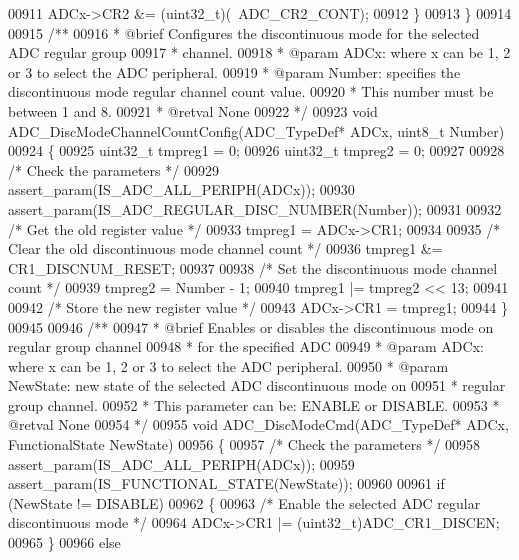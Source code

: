 \begin{DoxyCode}
00911     ADCx->CR2 &= (uint32\_t)(~ADC_CR2_CONT);
00912   \}
00913 \}
00914 
00915 \textcolor{comment}{/**}
00916 \textcolor{comment}{  * @brief  Configures the discontinuous mode for the selected ADC regular group }
00917 \textcolor{comment}{  *         channel.}
00918 \textcolor{comment}{  * @param  ADCx: where x can be 1, 2 or 3 to select the ADC peripheral.}
00919 \textcolor{comment}{  * @param  Number: specifies the discontinuous mode regular channel count value.}
00920 \textcolor{comment}{  *          This number must be between 1 and 8.}
00921 \textcolor{comment}{  * @retval None}
00922 \textcolor{comment}{  */}
00923 \textcolor{keywordtype}{void} ADC_DiscModeChannelCountConfig(ADC\_TypeDef* ADCx, uint8\_t Number)
00924 \{
00925   uint32\_t tmpreg1 = 0;
00926   uint32\_t tmpreg2 = 0;
00927 
00928   \textcolor{comment}{/* Check the parameters */}
00929   assert_param(IS\_ADC\_ALL\_PERIPH(ADCx));
00930   assert_param(IS\_ADC\_REGULAR\_DISC\_NUMBER(Number));
00931 
00932   \textcolor{comment}{/* Get the old register value */}
00933   tmpreg1 = ADCx->CR1;
00934 
00935   \textcolor{comment}{/* Clear the old discontinuous mode channel count */}
00936   tmpreg1 &= CR1_DISCNUM_RESET;
00937 
00938   \textcolor{comment}{/* Set the discontinuous mode channel count */}
00939   tmpreg2 = Number - 1;
00940   tmpreg1 |= tmpreg2 << 13;
00941 
00942   \textcolor{comment}{/* Store the new register value */}
00943   ADCx->CR1 = tmpreg1;
00944 \}
00945 
00946 \textcolor{comment}{/**}
00947 \textcolor{comment}{  * @brief  Enables or disables the discontinuous mode on regular group channel }
00948 \textcolor{comment}{  *         for the specified ADC}
00949 \textcolor{comment}{  * @param  ADCx: where x can be 1, 2 or 3 to select the ADC peripheral.}
00950 \textcolor{comment}{  * @param  NewState: new state of the selected ADC discontinuous mode on }
00951 \textcolor{comment}{  *         regular group channel.}
00952 \textcolor{comment}{  *          This parameter can be: ENABLE or DISABLE.}
00953 \textcolor{comment}{  * @retval None}
00954 \textcolor{comment}{  */}
00955 \textcolor{keywordtype}{void} ADC_DiscModeCmd(ADC\_TypeDef* ADCx, FunctionalState NewState)
00956 \{
00957   \textcolor{comment}{/* Check the parameters */}
00958   assert_param(IS\_ADC\_ALL\_PERIPH(ADCx));
00959   assert_param(IS\_FUNCTIONAL\_STATE(NewState));
00960 
00961   \textcolor{keywordflow}{if} (NewState != DISABLE)
00962   \{
00963     \textcolor{comment}{/* Enable the selected ADC regular discontinuous mode */}
00964     ADCx->CR1 |= (uint32\_t)ADC_CR1_DISCEN;
00965   \}
00966   \textcolor{keywordflow}{else}

\end{DoxyCode}

